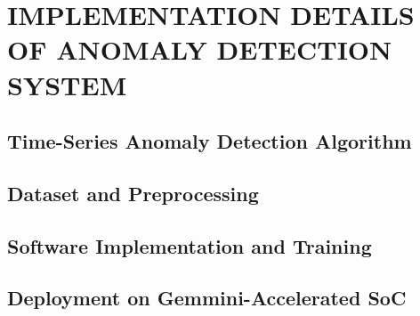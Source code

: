 
\chapter{IMPLEMENTATION DETAILS OF ANOMALY DETECTION SYSTEM}
\label{Chapter3}


\section{Time-Series Anomaly Detection Algorithm}
\label{sec:anomaly_detection_algorithm}

\section{Dataset and Preprocessing}
\label{sec:dataset_preprocessing}

\section{Software Implementation and Training}
\label{sec:software_implementation_training}

\section{Deployment on Gemmini-Accelerated SoC}
\label{sec:deployment_on_soc}

